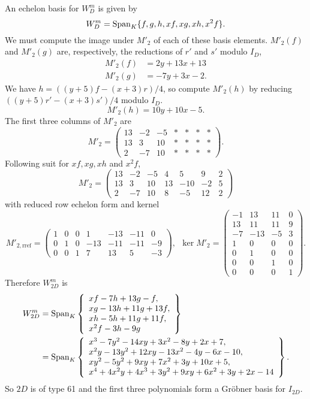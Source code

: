 An echelon basis for $W_D^m$ is given by
\[ W_D^m = \operatorname{Span}_K\{ f, g, h, xf, xg, xh, x^2f\}. \]
We must compute the image under $M'_2$ of each of these basis elements.
$M'_2(f)$ and $M'_2(g)$ are, respectively, the reductions of $r'$ and $s'$ modulo $I_D$,
\begin{align*}
  M'_2(f) &= 2y + 13x + 13 \\
  M'_2(g) &= -7y + 3x - 2.
\end{align*}
We have $h = ((y + 5)f - (x + 3)r)/4$, so compute $M'_2(h)$ by reducing $((y + 5)r' - (x + 3)s')/4$ modulo $I_D$.
\[ M'_2(h) = 10y + 10x - 5. \]
The first three columns of $M'_2$ are
\[ M'_2 = \begin{pmatrix}
   13 & -2 & -5 & * & * & * & * \\
   13 &  3 & 10 & * & * & * & * \\
    2 & -7 & 10 & * & * & * & *
\end{pmatrix}. \]
Following suit for $xf, xg, xh$ and $x^2f$,
\[ M'_2 = \begin{pmatrix}
   13 & -2 & -5 &  4 &   5 &  9 & 2 \\
   13 &  3 & 10 & 13 & -10 & -2 & 5 \\
    2 & -7 & 10 &  8 &  -5 & 12 & 2
\end{pmatrix} \]
with reduced row echelon form and kernel
\[ M'_{2,\text{rref}} = \begin{pmatrix}
  1 & 0 & 0 &   1 & -13 & -11 &  0 \\
  0 & 1 & 0 & -13 & -11 & -11 & -9 \\
  0 & 0 & 1 &   7 &  13 &   5 & -3
\end{pmatrix}, ~~
\ker M'_2 = \begin{pmatrix}
   -1 &  13 & 11 & 0 \\
   13 &  11 & 11 & 9 \\
   -7 & -13 & -5 & 3 \\
    1 &   0 &  0 & 0 \\
    0 &   1 &  0 & 0 \\
    0 &   0 &  1 & 0 \\
    0 &   0 &  0 & 1
\end{pmatrix}. \]
Therefore $W_{2D}^m$ is
\begin{align*}
  W_{2D}^m &= \operatorname{Span}_K
\left\{ \begin{array}{l}
    xf   -  7h + 13g -   f, \\
    xg   - 13h + 11g + 13f, \\
    xh   -  5h + 11g + 11f, \\
    x^2f -  3h -  9g
\end{array} \right\} \\
&= \operatorname{Span}_K
\left\{ \begin{array}{l}
     x^3 -  7y^2 - 14xy +  3x^2 - 8y +  2x +  7, \\
    x^2y - 13y^2 + 12xy - 13x^2 - 4y -  6x - 10, \\
    xy^2 -  5y^2 +  9xy +  7x^2 + 3y + 10x +  5, \\
     x^4 + 4x^2y + 4x^3 + 3y^2 + 9xy + 6x^2 + 3y + 2x - 14
\end{array} \right\}.
\end{align*}
So $2D$ is of type 61 and the first three polynomials form a Gr\"obner basis for $I_{2D}$.
